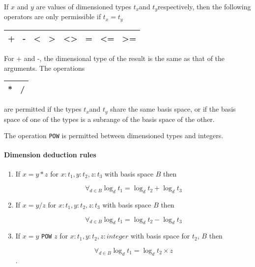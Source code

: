 If $ x $ and $ y $ are values of dimensioned types
$ t_{x} $and $ t_{y} $respectively, then the following operators are only
permissible if $ t_{x}=t_{y} $

\vspace{0.3cm}
{\centering \begin{tabular}{|c|c|c|c|c|c|c|c|}
\hline 
+&
-&
<&
>&
<>&
=&
<=&
>=\\
\hline 
\end{tabular}\par}
\vspace{0.3cm}

For + and -, the dimensional type of the result is the same
as that of the arguments. The operations 

\vspace{0.3cm}
{\centering \begin{tabular}{|c|c|}
\hline 
{*}&
/\\
\hline 
\end{tabular}\par}
\vspace{0.3cm}

are permitted if the types $ t_{x} $and $ t_{y} $ share the same basis
space, or if the basis space of one of the types is a subrange of the basis
space of the other.  

The operation \texttt{POW} is permitted between dimensioned types and integers.


\paragraph*{Dimension deduction rules}

\begin{enumerate}
\item If $ x=y*z $ for $ x:t_{1},y:t_{2},z:t_{3} $ with basis space $ B $
then 

 
 $$ \forall _{ d \in B } \log_dt_1= \log_dt_2+\log_dt_3 $$
 
\item If $ x=y/z $ for $ x:t_{1},y:t_{2},z:t_{3} $ with basis space $ B $
then 

 
$$ \forall_{d \in B}\log _{d}t_{1}=\log _{d}t_{2}-\log _{d}t_{3} $$
 
\item If $ x=y $ \texttt{POW} $ z $ for $ x:t_{1},y:t_{2},z:integer $ with
basis space for $ t_{2} $, $ B $ then 

 
$$ \forall_{d\in B}\log _{d}t_{1}=\log _{d}t_{2}\times z $$.
 
\end{enumerate}

